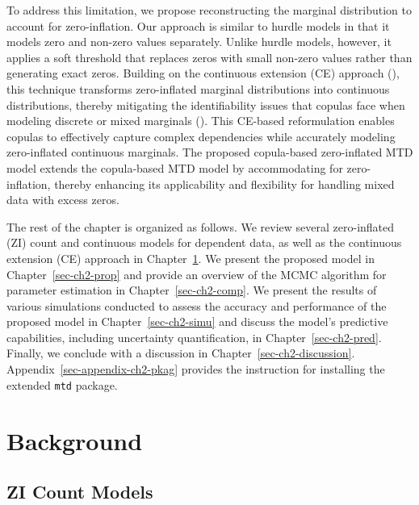 \documentclass[
  letterpaper,
  double,
  12pt,
  1.0in]{beavtex}
\begin{document}
To address this limitation, we propose reconstructing the marginal
distribution to account for zero-inflation. Our approach is similar to
hurdle models in that it models zero and non-zero values separately.
Unlike hurdle models, however, it applies a soft threshold that replaces
zeros with small non-zero values rather than generating exact zeros.
Building on the continuous extension (CE) approach
(), this
technique transforms zero-inflated marginal distributions into
continuous distributions, thereby mitigating the identifiability issues
that copulas face when modeling discrete or mixed marginals
(). This
CE-based reformulation enables copulas to effectively capture complex
dependencies while accurately modeling zero-inflated continuous
marginals. The proposed copula-based zero-inflated MTD model extends the
copula-based MTD model by accommodating for zero-inflation, thereby
enhancing its applicability and flexibility for handling mixed data with
excess zeros.

The rest of the chapter is organized as follows. We review several
zero-inflated (ZI) count and continuous models for dependent data, as
well as the continuous extension (CE) approach in
Chapter~\ref{sec-ch2-background}. We present the proposed model in
Chapter~\ref{sec-ch2-prop} and provide an overview of the MCMC algorithm
for parameter estimation in Chapter~\ref{sec-ch2-comp}. We present the
results of various simulations conducted to assess the accuracy and
performance of the proposed model in Chapter~\ref{sec-ch2-simu} and
discuss the model's predictive capabilities, including uncertainty
quantification, in Chapter~\ref{sec-ch2-pred}. Finally, we conclude with
a discussion in Chapter~\ref{sec-ch2-discussion}.
Appendix~\ref{sec-appendix-ch2-pkag} provides the instruction for
installing the extended \texttt{mtd} package.

\chapter{Background}\label{sec-ch2-background}

\section{ZI Count Models}\label{sec-ch2-background-zi-count}
\end{document}
